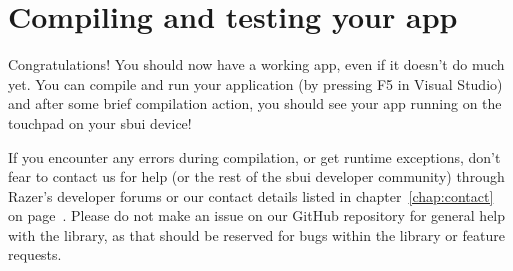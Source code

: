 \section{Compiling and testing your app}
Congratulations! You should now have a working app, even if it doesn't do much yet. You can compile and run your application (by pressing F5 in Visual Studio) and after some brief compilation action, you should see your app running on the touchpad on your \gls{sbui} device!

If you encounter any errors during compilation, or get runtime exceptions, don't fear to contact us for help (or the rest of the \gls{sbui} developer community) through Razer's developer forums or our contact details listed in chapter~\ref{chap:contact} on page~\pageref{chap:contact}. Please do not make an issue on our GitHub repository for general help with the library, as that should be reserved for bugs within the library or feature requests.
